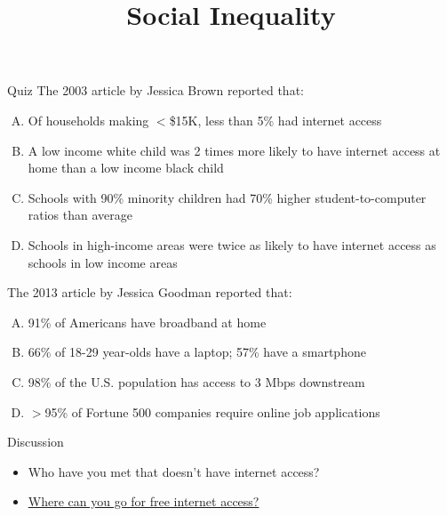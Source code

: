\documentclass{beamer}
\title{Social Inequality}
\date{}
\begin{document}
\begin{frame}
\titlepage
\end{frame}

\begin{frame}{Quiz}
The 2003 article by Jessica Brown reported that:
\begin{enumerate}[(A)]
\item<1> Of households making $<$\$15K, less than 5\% had internet access %
\item<1> A low income white child was 2 times more likely to have internet access at home than a low income black child %
\item<1-2> Schools with 90\% minority children had 70\% higher student-to-computer ratios than average %
\item<1> Schools in high-income areas were twice as likely to have internet access as schools in low income areas %
\end{enumerate}
\bigskip
The 2013 article by Jessica Goodman reported that:
\begin{enumerate}[(A)]
\item<1> 91\% of Americans have broadband at home %
\item<1> 66\% of 18-29 year-olds have a laptop; 57\% have a smartphone %
\item<1-2> 98\% of the U.S. population has access to 3 Mbps downstream
\item<1> $>$95\% of Fortune 500 companies require online job applications %
\end{enumerate}
\end{frame}

\begin{frame}{Discussion}
\begin{itemize}
\item Who have you met that doesn't have internet access?
\bigskip
\item \href{http://www.openwifispots.com/FinderDirectoryCity.aspx?City=Birmingham&State=AL}{Where can you go for free internet access?}
\end{itemize}
\end{frame}
\end{document}
